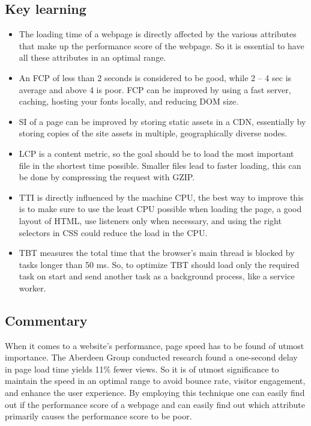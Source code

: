 \subsection{Key learning}
\begin{itemize}
    \item The loading time of a webpage is directly affected by the various attributes that make up the performance score of the webpage. So it is essential to have all these attributes in an optimal range.
    \item An FCP of less than 2 seconds is considered to be good, while 2 – 4 sec is average and above 4 is poor. FCP can be improved by using a fast server, caching, hosting your fonts locally, and reducing DOM size.
    \item SI of a page can be improved by storing static assets in a CDN, essentially by storing copies of the site assets in multiple, geographically diverse nodes.
    \item LCP is a content metric, so the goal should be to load the most important file in the shortest time possible. Smaller files lead to faster loading, this can be done by compressing the request with GZIP.
    \item TTI is directly influenced by the machine CPU, the best way to improve this is to make sure to use the least CPU possible when loading the page, a good layout of HTML, use listeners only when necessary, and using the right selectors in CSS could reduce the load in the CPU.
    \item TBT measures the total time that the browser’s main thread is blocked by tasks longer than 50 ms. So, to optimize TBT should load only the required task on start and send another task as a background process, like a service worker.
  \end{itemize}

\pagebreak

\subsection{Commentary}
When it comes to a website's performance, page speed has to be found of utmost importance. The Aberdeen Group conducted research found a one-second delay in page load time yields 11\% fewer views.\newline\newline
\noindent
So it is of utmost significance to maintain the speed in an optimal range to avoid bounce rate, visitor engagement, and enhance the user experience.  \newline\newline 
\noindent
By employing this technique one can easily find out if the performance score of a webpage and can easily find out which attribute primarily causes the performance score to be poor.

